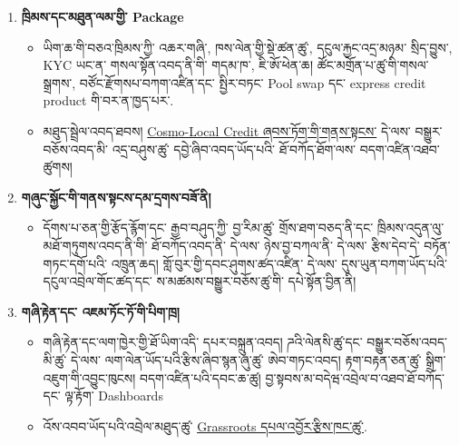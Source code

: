 \documentclass[11pt]{article}
\begin{document}
\begin{enumerate}[leftmargin=*]
\begin{itemize}[leftmargin=*]
\end{itemize}
\item \textbf{ཁྲིམས་དང་མཐུན་ལམ་གྱི་ Package}
\begin{itemize}[leftmargin=*]
\item ཡིག་ཆ་གི་བཅའ་ཁྲིམས་ཀྱི་ འཆར་གཞི་, ཁས་ལེན་གྱི་སྡེ་ཚན་ཚུ་, དངུལ་རྐྱང་འདྲ་མཉམ་ སྲིད་བྱུས་, KYC ཡང་ན་ གསལ་སྟོན་འབད་ནི་གི་ གདམ་ཁ་, ཇི་ཨོ་ཕེན་ཆ། ཚོང་མགྲོན་པ་ཚུ་གི་གསལ་སྒྲགས་, བཙོང་རྫོགསཔ་བཀག་འཛིན་དང་ སྤྱིར་བཏང་ Pool swap དང་ express credit product གི་བར་ན་ཁྱད་པར་.
\item མཐུད་སྦྲེལ་འབད་ཐབས། \href{https://docs.cosmolocal.credit/dz/governance/terms}{Cosmo-Local Credit ཞབས་ཏོག་གི་གནས་སྟངས་} དེ་ལས་ བསྒྱུར་བཅོས་འབད་མི་ འདྲ་བཤུས་ཚུ་ དབྱེ་ཞིབ་འབད་ཡོད་པའི་ ཐོ་བཀོད་ཐོག་ལས་ བདག་འཛིན་འཐབ་ཚུགས།
\end{itemize}
\item \textbf{གཞུང་སྐྱོང་གི་གནས་སྟངས་དམ་དྲགས་བཟོ་ནི།}
\begin{itemize}[leftmargin=*]
\item དོགས་པ་ཅན་གྱི་རྩོད་རྙོག་དང་ རྒྱབ་བཤུད་ཀྱི་ བྱ་རིམ་ཚུ་ གྲོས་ཐག་བཅད་ནི་དང་ ཁྲིམས་འདུན་ལུ་ མཐོ་གཏུགས་འབད་ནི་གི་ ཐོ་བཀོད་འབད་ནི་ དེ་ལས་ ཉེས་བྱ་བཀལ་ནི་ དེ་ལས་ རྩིས་དེབ་དེ་ བཏོན་གཏང་དགོ་པའི་ འཁྲུན་ཆད། གློ་བུར་གྱི་དབང་ཤུགས་ཚད་འཛིན་ དེ་ལས་ དུས་ཡུན་བཀག་ཡོད་པའི་ དངུལ་འབྲེལ་གོང་ཚད་དང་ ས་མཚམས་བསྒྱུར་བཅོས་ཚུ་གི་ དཔེ་སྟོན་བྱིན་ནི།
\end{itemize}
\item \textbf{གཞི་རྟེན་དང་ འཇམ་ཏོང་ཏོ་གི་པིག་ཁྲ།}
\begin{itemize}[leftmargin=*]
\item གཞི་རྟེན་དང་ལག་ཁྱེར་གྱི་ཐོ་ཡིག་འདི་ དཔར་བསྐྲུན་འབད། ཌའི་ལེནསི་ཚུ་དང་ བསྒྱུར་བཅོས་འབད་མི་ཚུ་ དེ་ལས་ ལག་ལེན་ཡོད་པའི་རྩིས་ཞིབ་སྙན་ཞུ་ཚུ་ ཨེབ་གཏང་འབད། རྟག་བརྟན་ཅན་ཚུ་ སྒྲིག་འཇུག་གི་འབྱུང་ཁུངས། བདག་འཛིན་པའི་དབང་ཆ་ཚུ། བྱ་སྟབས་མ་བདེཝ་འབྲེལ་བ་འཐབ་ཐོ་བཀོད་དང་ ལྟ་རྟོག་ Dashboards
\item འོས་འབབ་ཡོད་པའི་འབྲེལ་མཐུད་ཚུ་ \href{https://github.com/grassrootseconomics}{Grassroots དཔལ་འབྱོར་རྩིས་ཁང་ཚུ་}.
\end{itemize}
\end{enumerate}
\end{document}
